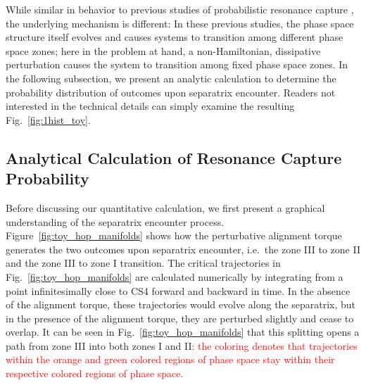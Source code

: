 \documentclass[
        fleqn,
        usenatbib,
        referee
    ]{mnras}
\begin{document}
While similar in behavior to previous studies of probabilistic resonance capture
\citep{henrard1982, su2020}, the underlying mechanism is different: In these
previous studies, the phase space structure itself evolves and causes systems to
transition among different phase space zones; here in the problem at hand, a
non-Hamiltonian, dissipative perturbation causes the system to transition among
fixed phase space zones. In the following subsection, we present an analytic
calculation to determine the probability distribution of outcomes upon
separatrix encounter. Readers not interested in the technical details can simply
examine the resulting Fig.~\ref{fig:1hist_toy}.

\subsection{Analytical Calculation of Resonance Capture
Probability}\label{ss:analytic_calculation}

Before discussing our quantitative calculation, we first present a graphical
understanding of the separatrix encounter process.
Figure~\ref{fig:toy_hop_manifolds} shows how the perturbative alignment torque
generates the two outcomes upon separatrix encounter, i.e.\ the zone III to zone
II and the zone III to zone I transition. The critical trajectories in
Fig.~\ref{fig:toy_hop_manifolds} are calculated numerically by integrating from
a point infinitesimally close to CS4 forward and backward in time. In the
absence of the alignment torque, these trajectories would evolve along the
separatrix, but in the presence of the alignment torque, they are perturbed
slightly and cease to overlap. It can be seen in
Fig.~\ref{fig:toy_hop_manifolds} that this splitting opens a path from zone III
into both zones I and II\textcolor{red}{: the coloring denotes that trajectories
within the orange and green colored regions of phase space stay within their
respective colored regions of phase space.}
\end{document}
